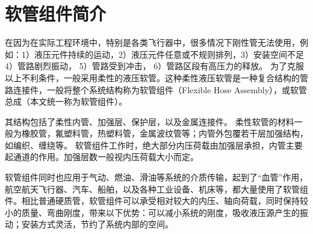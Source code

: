 \section{软管组件简介}

在因为在实际工程环境中，特别是各类飞行器中，很多情况下刚性管无法使用，例如：1）液压元件持续的运动，2）液压元件任意或不规则排列，3）安装空间不足
4）管路剧烈振动，
5）管路受到冲击，
6）管路区段有高压力的释放。
为了克服以上不利条件，一般采用柔性的液压软管。这种柔性液压软管是一种复合结构的管路连接件，一般将整个系统结构称为软管组件（Flexible Hose Assembly），或软管总成（本文统一称为软管组件）。





其结构包括了柔性内管、加强层、保护层，以及金属连接件。
柔性软管的材料一般为橡胶管，氟塑料管，热塑料管，金属波纹管等；内管外包覆若干层加强结构，如编织、缠绕等。
软管组件工作时，绝大部分内压荷载由加强层承担，内管主要起通道的作用。加强层数一般视内压荷载大小而定。


\begin{figure}[!htbp]
	\centering
	\hspace{0.5cm}
\end{figure}


软管组件同时也应用于气动、燃油、滑油等系统的介质传输，起到了“血管”作用，航空航天飞行器、汽车、船舶，以及各种工业设备、机床等，都大量使用了软管组件。相比普通硬质管，软管组件可以承受相对较大的内压、轴向荷载，同时保持较小的质量、弯曲刚度，带来以下优势：可以减小系统的刚度，吸收液压源产生的振动；安装方式灵活，节约了系统内部的空间。





